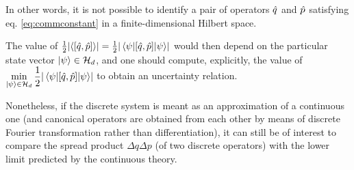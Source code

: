 In other words, it is not possible to identify a pair of operators $\hat{q}$ and $\hat{p}$
satisfying eq. \eqref{eq:commconstant} in a finite-dimensional Hilbert space.

The value of $\frac{1}{2} \qty|\ev{\qty[\op{q}, \op{p}]}| = \frac{1}{2} \qty|\ev{\qty[\op{q}, \op{p}]}{\psi}|$
would then  depend on the particular state vector $\ket{\psi} \in \mathcal{H}_d$,
and one should compute, explicitly, the value of
$\displaystyle \min_{\ket{\psi} \in \hilb{H}_d} \frac{1}{2} \qty|\ev{\qty[\op{q}, \op{p}]}{\psi}|$
to obtain an uncertainty relation.

Nonetheless, if the discrete system is meant as an approximation of a continuous
one
(and canonical operators are obtained from each other by means of discrete Fourier transformation rather than differentiation),
it can still be of interest to compare the spread product $\Delta{q}\Delta{p}$
(of two discrete operators)
with the lower limit predicted by the continuous theory.



